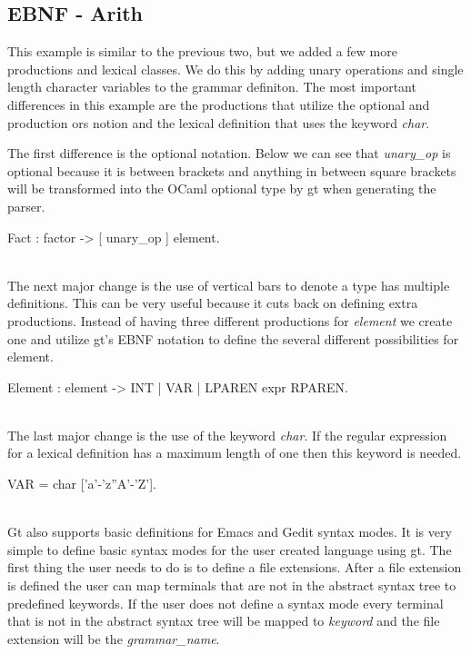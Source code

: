 \subsection{EBNF - Arith}
This example is similar to the previous two, but we added a few more productions and lexical classes.
We do this by adding unary operations and single length character variables to the grammar definiton. The most important 
differences in this example are the productions that utilize the optional and production ors notion and the
lexical definition that uses the keyword \textit{char}.

The first difference is the optional notation. Below we can see that \textit{unary\_op} is optional because it is
between brackets and anything in between square brackets will be transformed into the OCaml optional type
by gt when generating the parser. \\
%
%
\begin{gt}
Fact : factor -> [ unary_op ] element.
\end{gt}\ \\
%
%
The next major change is the use of vertical bars to denote a type has multiple definitions. This 
can be very useful because it cuts back on defining extra productions. Instead of 
having three different productions for \textit{element} we create one and utilize gt's EBNF notation to define the 
several different possibilities for element.\\
%
%
\begin{gt} 
Element : element -> INT | VAR | LPAREN expr RPAREN.
\end{gt}\ \\
%
%
The last major change is the use of the keyword \textit{char}. If the regular expression for a lexical
definition has a maximum length of one then this keyword is needed. \\
%
%
\begin{gt} 
VAR = char {{ ['a'-'z''A'-'Z']}}.
\end{gt}\ \\
%
%
Gt also supports basic definitions for Emacs and Gedit syntax modes. It is very simple to define basic syntax
modes for the user created language using gt. The first thing the user needs to do is to define a file extensions.
After a file extension is defined the user can map terminals that are not in the abstract syntax tree to
predefined keywords. If the user does not define a syntax mode every terminal that is not in the abstract syntax tree
will be mapped to \textit{keyword} and the file extension will be the \textit{grammar\_name}. \\
